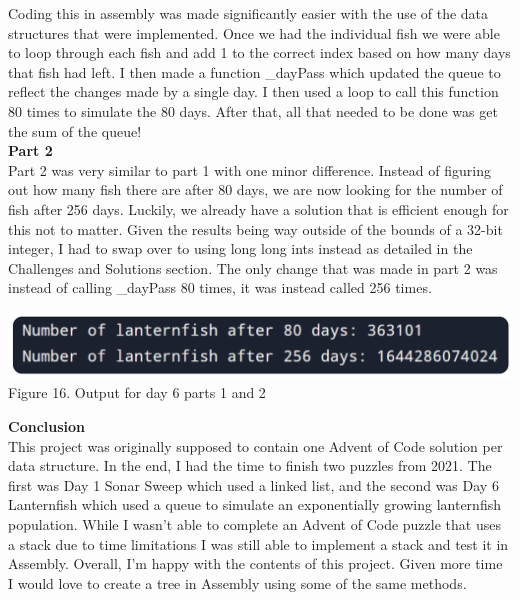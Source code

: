 \documentclass[twoside]{article}
\begin{document}
\noindent Coding this in assembly was made significantly easier with the use of the data structures that were implemented. Once we had the individual fish we were able to loop through each fish and add 1 to the correct index based on how many days that fish had left. I then made a function \_dayPass which updated the queue to reflect the changes made by a single day. I then used a loop to call this function 80 times to simulate the 80 days. After that, all that needed to be done was get the sum of the queue!\\

\noindent \textbf{\large Part 2} \\
\noindent Part 2 was very similar to part 1 with one minor difference. Instead of figuring out how many fish there are after 80 days, we are now looking for the number of fish after 256 days. Luckily, we already have a solution that is efficient enough for this not to matter. Given the results being way outside of the bounds of a 32-bit integer, I had to swap over to using long long ints instead as detailed in the Challenges and Solutions section. The only change that was made in part 2 was instead of calling \_dayPass 80 times, it was instead called 256 times.
\begin{center}
    \includegraphics[width=.8\textwidth]{images/day06Output.png}\\
    Figure 16. Output for day 6 parts 1 and 2
\end{center}


\noindent \textbf{\Large Conclusion} \\
\noindent This project was originally supposed to contain one Advent of Code solution per data structure. In the end, I had the time to finish two puzzles from 2021. The first was Day 1 Sonar Sweep which used a linked list, and the second was Day 6 Lanternfish which used a queue to simulate an exponentially growing lanternfish population. While I wasn’t able to complete an Advent of Code puzzle that uses a stack due to time limitations I was still able to implement a stack and test it in Assembly. Overall, I’m happy with the contents of this project. Given more time I would love to create a tree in Assembly using some of the same methods.\\\\
\end{document}
